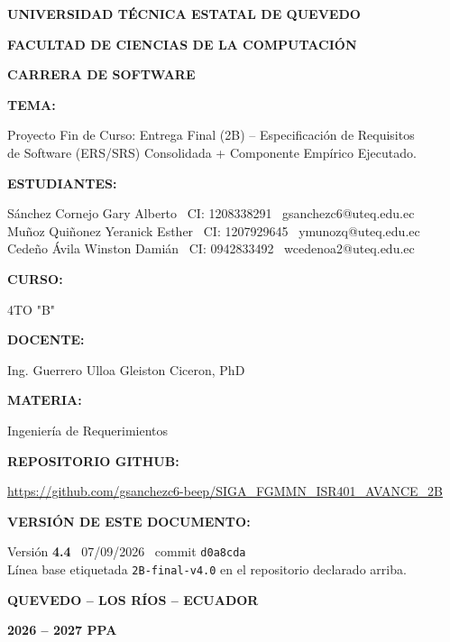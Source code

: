 \documentclass[11pt,a4paper]{article}
\title{}
\date{}
\begin{document}
\begin{titlepage}
\centering
{\bfseries\Large UNIVERSIDAD T\'ECNICA ESTATAL DE QUEVEDO\par}
\vspace{2mm}
{\bfseries\large FACULTAD DE CIENCIAS DE LA COMPUTACI\'ON\par}
\vspace{2mm}
{\bfseries\large CARRERA DE SOFTWARE\par}
\vspace{10mm}
{\bfseries TEMA:\par}
\vspace{2mm}
Proyecto Fin de Curso: Entrega Final (2B) -- Especificaci\'on de Requisitos\\
de Software (ERS/SRS) Consolidada + Componente Emp\'irico Ejecutado.
\vspace{8mm}

{\bfseries ESTUDIANTES:\par}
\vspace{2mm}
S\'anchez Cornejo Gary Alberto \textbar\ CI: 1208338291 \textbar\ gsanchezc6@uteq.edu.ec\\
Mu\~noz Qui\~nonez Yeranick Esther \textbar\ CI: 1207929645 \textbar\ ymunozq@uteq.edu.ec\\
Cede\~no \'Avila Winston Dami\'an \textbar\ CI: 0942833492 \textbar\ wcedenoa2@uteq.edu.ec
\vspace{8mm}

{\bfseries CURSO:\par}
4TO "B"
\vspace{6mm}

{\bfseries DOCENTE:\par}
Ing. Guerrero Ulloa Gleiston Ciceron, PhD
\vspace{6mm}

{\bfseries MATERIA:\par}
Ingenier\'ia de Requerimientos
\vspace{6mm}

{\bfseries REPOSITORIO GITHUB:\par}
\url{https://github.com/gsanchezc6-beep/SIGA_FGMMN_ISR401_AVANCE_2B}
\vspace{6mm}

{\bfseries VERSI\'ON DE ESTE DOCUMENTO:\par}
\vspace{2mm}
Versi\'on \textbf{4.4} \textbar\ 07/09/2026 \textbar\ commit \texttt{d0a8cda}\\
L\'inea base etiquetada \texttt{2B-final-v4.0} en el repositorio declarado arriba.
\vspace{8mm}

{\bfseries QUEVEDO -- LOS R\'IOS -- ECUADOR\par}
{\bfseries 2026 -- 2027 PPA\par}
\end{titlepage}
\end{document}
